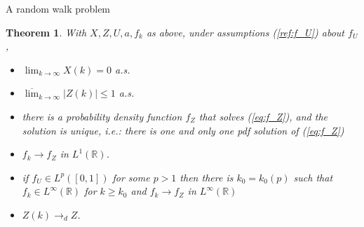 \documentclass[12pt]{article}
\newtheorem*{thm}{Theorem}
\begin{document}
\begin{section}{A random walk problem}
\begin{thm} With $X,Z,U,a, f_k$ as above, under assumptions (\ref{ref:f_U}) about $f_U$,
	\begin{itemize}
	\item[a)]  $ \lim_{k \rightarrow \infty} X(k) = 0$ a.s. 
	\item[b)]  $ \overline{ \lim}_{k \rightarrow \infty} |Z(k)| \le 1 $ a.s.
	\item[c)] there is a probability density function $f_Z$ that solves (\ref{eq:f_Z}), and the solution is unique, i.e.: there is one and only one pdf solution of (\ref{eq:f_Z})
	\item[d)] $ f_k  \rightarrow f_Z$ in $L^1(\mathbb{R})$.
	\item[e)] if $f_U \in L^{p}([0,1])$ for some $p>1$ then there is $k_0 = k_0(p)$ such that $f_k \in L^{\infty}(\mathbb{R})$ for $k \ge k_0$ and 
	$ f_k  \rightarrow f_Z$ in $L^{\infty}(\mathbb{R})$
	\item[f)] $Z(k) \rightarrow_d Z$.
	\end{itemize}
\end{thm}

\end{section}
\end{document}
